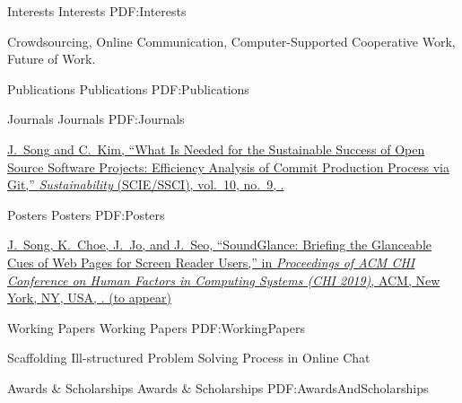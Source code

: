 \documentclass[letterpaper,MMMyyyy,nonstopmode]{simpleresumecv}
\begin{document}
\begin{Body}
    
\BigGap
\Section
{Interests}
{Interests}
{PDF:Interests}

\Entry
Crowdsourcing,
Online Communication,
Computer-Supported Cooperative Work,
Future of Work.



\BigGap
\Section
{Publications}
{Publications}
{PDF:Publications}

\SubSection
{Journals}
{Journals}
{PDF:Journals}

\begingroup
\renewcommand{\MaxNumberedItem}{[88]}

\BigGap
\NumberedItem{[1]}
\href{https://doi.org/10.3390/su10093001}
{\underline{J.~Song} and C.~Kim,
``What Is Needed for the Sustainable Success of Open Source Software Projects: Efficiency Analysis of Commit Production Process via Git,''
\textit{Sustainability} (SCIE/SSCI),
vol.~10,
no.~9,
.}

\endgroup

\BigGap
\SubSection
{Posters}
{Posters}
{PDF:Posters}

\begingroup
\renewcommand{\MaxNumberedItem}{[88]}

\BigGap
\NumberedItem{[1]}
\href{}
{\underline{J.~Song}, K.~Choe, J.~Jo, and J.~Seo,
``SoundGlance: Briefing the Glanceable Cues of Web Pages for Screen Reader Users,''
in \textit{Proceedings of ACM CHI Conference on Human Factors in Computing Systems (CHI 2019)},
ACM, New York, NY, USA,
. (to appear)}

\endgroup

\BigGap
\SubSection
{Working Papers}
{Working Papers}
{PDF:WorkingPapers}

\begingroup
\renewcommand{\MaxNumberedItem}{[88]}

\BigGap
\NumberedItem{[1]}
Scaffolding Ill-structured Problem Solving Process in Online Chat

\endgroup



\BigGap
\Section
{Awards \&\newline
Scholarships}
{Awards \& Scholarships}
{PDF:AwardsAndScholarships}


\end{Body}
\end{document}
